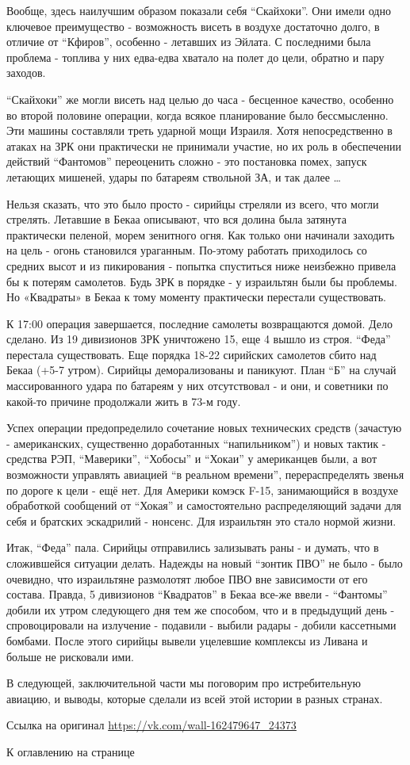 Вообще, здесь наилучшим образом показали себя “Скайхоки”. Они имели одно ключевое преимущество - возможность висеть в воздухе достаточно долго, в отличие от “Кфиров”, особенно - летавших из Эйлата. С последними была проблема - топлива у них едва-едва хватало на полет до цели, обратно и пару заходов.

“Скайхоки” же могли висеть над целью до часа - бесценное качество, особенно во второй половине операции, когда всякое планирование было бессмысленно. Эти машины составляли треть ударной мощи Израиля. Хотя непосредственно в атаках на ЗРК они практически не принимали участие, но их роль в обеспечении действий “Фантомов” переоценить сложно - это постановка помех, запуск летающих мишеней, удары по батареям ствольной ЗА, и так далее …

Нельзя сказать, что это было просто - сирийцы стреляли из всего, что могли стрелять. Летавшие в Бекаа описывают, что вся долина была затянута практически пеленой, морем зенитного огня. Как только они начинали заходить на цель - огонь становился ураганным. По-этому работать приходилось со средних высот и из пикирования - попытка спуститься ниже неизбежно привела бы к потерям самолетов. Будь ЗРК в порядке - у израильтян были бы проблемы. Но «Квадраты» в Бекаа к тому моменту практически перестали существовать.

К 17:00 операция завершается, последние самолеты возвращаются домой. Дело сделано. Из 19 дивизионов ЗРК уничтожено 15, еще 4 вышло из строя. “Феда” перестала существовать. Еще порядка 18-22 сирийских самолетов сбито над Бекаа (+5-7 утром). Сирийцы деморализованы и паникуют. План “Б” на случай массированного удара по батареям у них отсутствовал - и они, и советники по какой-то причине продолжали жить в 73-м году.

Успех операции предопределило сочетание новых технических средств (зачастую - американских, существенно доработанных “напильником”) и новых тактик - средства РЭП, “Маверики”, “Хобосы” и “Хокаи” у американцев были, а вот возможности управлять авиацией “в реальном времени”, перераспределять звенья по дороге к цели - ещё нет. Для Америки комэск F-15, занимающийся в воздухе обработкой сообщений от “Хокая” и самостоятельно распределяющий задачи для себя и братских эскадрилий - нонсенс. Для израильтян это стало нормой жизни.

Итак, “Феда” пала. Сирийцы отправились зализывать раны - и думать, что в сложившейся ситуации делать. Надежды на новый “зонтик ПВО” не было - было очевидно, что израильтяне размолотят любое ПВО вне зависимости от его состава. Правда, 5 дивизионов “Квадратов” в Бекаа все-же ввели - “Фантомы” добили их утром следующего дня тем же способом, что и в предыдущий день - спровоцировали на излучение - подавили - выбили радары - добили кассетными бомбами. После этого сирийцы вывели уцелевшие комплексы из Ливана и больше не рисковали ими.

В следующей, заключительной части мы поговорим про истребительную авиацию, и выводы, которые сделали из всей этой истории в разных странах.

Ссылка на оригинал \url{https://vk.com/wall-162479647_24373}

К оглавлению на странице \pageref{tablecont}